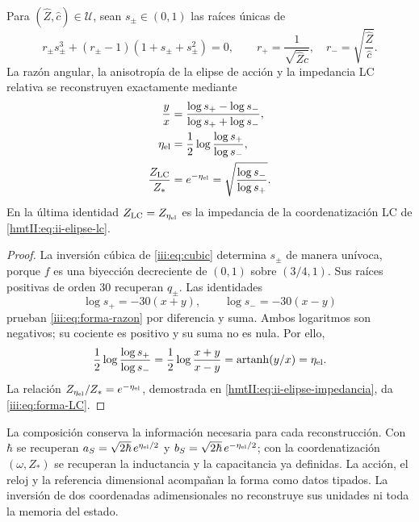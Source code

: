 \begin{proposition}
\label{iii:prop:forma-LC}
Para $(\widehat Z,\widehat c)\in\mathcal U$, sean $s_\pm\in(0,1)$ las
raíces únicas de
\begin{equation}
 r_\pm s_\pm^3+(r_\pm-1)(1+s_\pm+s_\pm^2)=0,
 \qquad
 r_+=\frac1{\sqrt{\widehat Z\widehat c}},\quad
 r_-=\sqrt{\frac{\widehat Z}{\widehat c}}.
 \label{iii:eq:forma-inversion}
\end{equation}
La razón angular, la anisotropía de la elipse de acción y la impedancia
LC relativa se reconstruyen exactamente mediante
\begin{align}
 \frac{y}{x}
 &=\frac{\log s_+-\log s_-}{\log s_++\log s_-},
 \label{iii:eq:forma-razon}\\
 \eta_{\rm el}
 &=\frac12\log\frac{\log s_+}{\log s_-},
 \label{iii:eq:forma-eta}\\
 \frac{Z_{\rm LC}}{Z_*}
 &=e^{-\eta_{\rm el}}
  =\sqrt{\frac{\log s_-}{\log s_+}}.
 \label{iii:eq:forma-LC}
\end{align}
En la última identidad $Z_{\rm LC}=Z_{\eta_{\rm el}}$ es la impedancia
de la coordenatización LC de \eqref{hmtII:eq:ii-elipse-lc}.
\end{proposition}
\begin{proof}
La inversión cúbica de \eqref{iii:eq:cubic} determina $s_\pm$ de manera
unívoca, porque $f$ es una biyección decreciente de $(0,1)$ sobre
$(3/4,1)$. Sus raíces positivas de orden $30$ recuperan $q_\pm$.
Las identidades
\[
 \log s_+=-30(x+y),\qquad \log s_-=-30(x-y)
\]
prueban \eqref{iii:eq:forma-razon} por diferencia y suma. Ambos logaritmos
son negativos; su cociente es positivo y su suma no es nula. Por ello,
\[
 \frac12\log\frac{\log s_+}{\log s_-}
   =\frac12\log\frac{x+y}{x-y}
   =\operatorname{artanh}(y/x)=\eta_{\rm el}.
\]
La relación $Z_{\eta_{\rm el}}/Z_*=e^{-\eta_{\rm el}}$, demostrada en
\eqref{hmtII:eq:ii-elipse-impedancia}, da \eqref{iii:eq:forma-LC}.
\end{proof}

La composición conserva la información necesaria para cada reconstrucción.
Con $\hbar$ se recuperan
$a_S=\sqrt{2\hbar}\,e^{\eta_{\rm el}/2}$ y
$b_S=\sqrt{2\hbar}\,e^{-\eta_{\rm el}/2}$; con la coordenatización
$(\omega,Z_*)$ se recuperan la inductancia y la capacitancia ya definidas.
La acción, el reloj y la referencia dimensional acompañan la forma como
datos tipados. La inversión de dos coordenadas adimensionales no
reconstruye sus unidades ni toda la memoria del estado.

